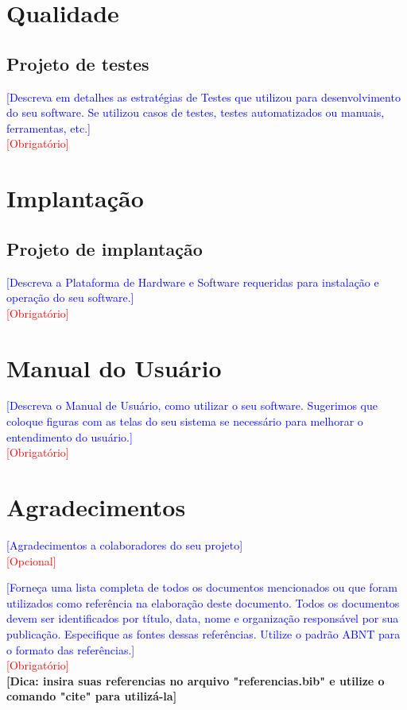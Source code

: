 \documentclass[11pt]{relatorio_tcc_ads_ifba}
\begin{document}
\section{Qualidade}

\subsection{Projeto de testes}
\textcolor{blue}{
    [Descreva em detalhes as estratégias de Testes que utilizou para desenvolvimento do seu software. Se utilizou casos de testes, testes automatizados ou manuais, ferramentas, etc.]
} \\
\textcolor{red}{[Obrigatório]}

\section{Implantação}
\subsection{Projeto de implantação}
\textcolor{blue}{
    [Descreva a Plataforma de Hardware e Software requeridas para instalação e operação do seu software.]
} \\
\textcolor{red}{[Obrigatório]}

\section{Manual do Usuário}{
\textcolor{blue}{
    [Descreva o Manual de Usuário, como utilizar o seu software. Sugerimos que coloque figuras com as telas do seu sistema se necessário para melhorar o entendimento do usuário.]
} \\
\textcolor{red}{[Obrigatório]}
}

\section*{Agradecimentos}
\textcolor{blue}{
    [Agradecimentos a colaboradores do seu projeto]
} \\
\textcolor{red}{[Opcional]}


\textcolor{blue}{
    [Forneça uma lista completa de todos os documentos mencionados ou que foram utilizados como referência na elaboração deste documento. Todos os documentos devem ser identificados por título, data, nome e organização responsável por sua publicação. Especifique as fontes dessas referências. Utilize o padrão ABNT para o formato das referências.]
} \\
\textcolor{red}{[Obrigatório]} \\
\textbf{[Dica: insira suas referencias no arquivo "referencias.bib" e utilize o comando "cite" para utilizá-la]}
\end{document}
